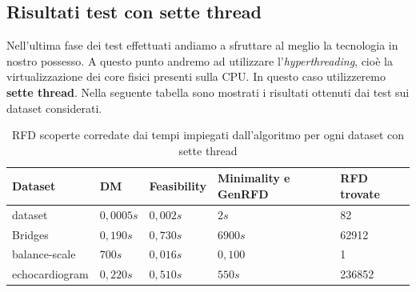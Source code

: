 \subsection{Risultati test con sette thread}
Nell'ultima fase dei test effettuati andiamo a sfruttare al meglio la tecnologia in nostro possesso.
A questo punto andremo ad utilizzare l'\emph{hyperthreading}, cioè la virtualizzazione dei core fisici presenti sulla CPU. In questo caso utilizzeremo \textbf{sette thread}.
Nella seguente tabella sono mostrati i risultati ottenuti dai test sui dataset considerati.
\begin{table}[H]
	\centering
	\begin{tabular}{lllll}
		Dataset & DM & Feasibility & Minimality e GenRFD & RFD trovate \\
		\hline
		dataset& $0,0005s$ & $0,002s$& $2s$  & 82 \\
		Bridges & $0,190s$  & $0,730s$ & $6900s$ & 62912 \\
		balance-scale  & $700s$  & $0,016s$ & $0,100$ & 1\\
		echocardiogram  & $0,220s$  & $0,510s$ & $550s$ & 236852\\
		\hline
	\end{tabular}
	\label{risultati_7_thread}
	\caption{RFD scoperte corredate dai tempi impiegati dall'algoritmo per ogni dataset con sette thread}
\end{table}

